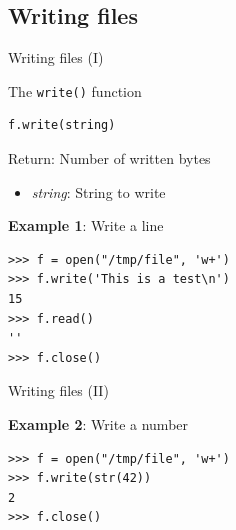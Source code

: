 \documentclass[10pt,compress]{beamer} %
\begin{document}
\subsection{Writing files}

\begin{frame}[fragile]{Writing files (I)}
	\begin{block}{The \texttt{write()} function}
	\vspace{-0.2cm}
\begin{verbatim}
f.write(string)
\end{verbatim}

	\vspace{-0.2cm}
	Return: Number of written bytes
	\begin{itemize}
	\item \textit{string}: String to write
	\end{itemize}
	\end{block}

	\textbf{Example 1}: Write a line
	\begin{verbatim}
>>> f = open("/tmp/file", 'w+')
>>> f.write('This is a test\n')
15
>>> f.read()
'' 
>>> f.close()
\end{verbatim}


\end{frame}

\begin{frame}[fragile]{Writing files (II)}
	

	\textbf{Example 2}: Write a number %
\begin{verbatim}
>>> f = open("/tmp/file", 'w+')
>>> f.write(str(42))
2
>>> f.close()
\end{verbatim}
\end{frame}
\end{document}

